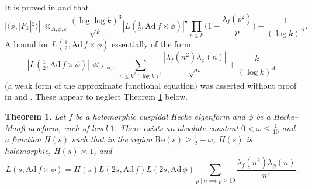 \documentclass[12pt,reqno]{amsart}
\newtheorem{thm}{Theorem}[section]
\theoremstyle{remark}
\numberwithin{equation}{section}
\begin{document}
It is proved in \cite[(3.2) and (11.1)]{Iwaniec} and  \cite[(4.2)]{LMR} that
\begin{equation}
\label{eqn:start_AFE}
|\langle\phi,|F_k|^2\rangle|\ll_{A,\phi,\varepsilon}\frac{(\log\log k)^3}{\sqrt{k}}|L(\tfrac{1}{2},\mathrm{Ad}\,f\times\phi)|^{\frac{1}{2}}\prod_{p\leq k}\Big(1-\frac{\lambda_f(p^2)}{p}\Big)+\frac{1}{(\log k)^{A}}.
\end{equation}
A bound for $L(\frac{1}{2},\mathrm{Ad}\,f\times\phi)$ essentially of the form
\begin{equation}
\label{eqn:false}
|L(\tfrac{1}{2},\mathrm{Ad}\,f\times\phi)|\ll_{A,\phi,\varepsilon}\sum_{n\leq k^2(\log k)^{\varepsilon}}\frac{|\lambda_{f}(n^2)\lambda_{\phi}(n)|}{\sqrt{n}}+\frac{k}{(\log k)^A}
\end{equation}
(a weak form of the approximate functional equation) was asserted without proof in \cite[Section 11.1]{Iwaniec} and \cite[(4.3)]{LMR}.  These appear to neglect Theorem \ref{thm:1} below.
\begin{thm}
\label{thm:1}
Let $f$ be a holomorphic cuspidal Hecke eigenform and $\phi$ be a Hecke--Maa{\ss} newform, each of level $1$.  There exists an absolute constant $0<\omega\leq \frac{1}{10}$ and a function $H(s)$ such that in the region $\mathrm{Re}(s)\geq \frac{1}{2}-\omega$, $H(s)$ is holomorphic, $H(s)\asymp 1$, and
\[
L(s,\mathrm{Ad}\, f\times \phi)=H(s) L(2s,\mathrm{Ad}\, f) L(2s,\mathrm{Ad}\, \phi) \sum_{p\mid n\implies p\ge 19}\frac{\lambda_{f}(n^2)\lambda_{\phi}(n)}{n^{s}}.
\]
\end{thm}
\end{document}
